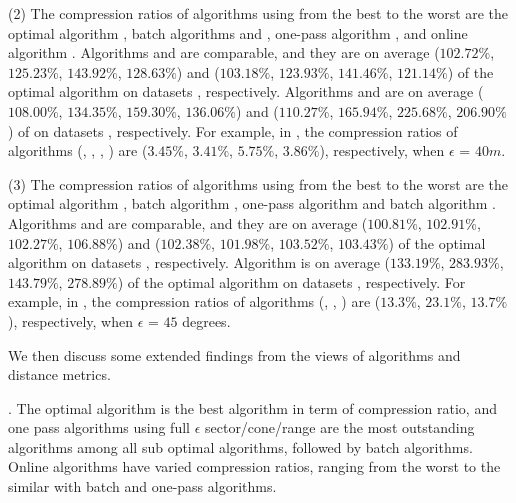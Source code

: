 \sstab(2) The compression ratios of algorithms using \sed from the best
to the worst are the optimal algorithm \opt, batch algorithms \tpa and
\dpa, one-pass algorithm \cised, and online algorithm \squishe.
%
{Algorithms \tpa and \dpa are comparable, and they are on average
($102.72\%$, $125.23\%$, $143.92\%$, $128.63\%$) and ($103.18\%$, $123.93\%$, $141.46\%$, $121.14\%$)
 of the optimal algorithm \opt on datasets \dSets, respectively.}
%
{Algorithms \cised and \squishe are on average ($108.00\%$,
  $134.35\%$, $159.30\%$, $136.06\%$) and ($110.27\%$, $165.94\%$, $225.68\%$, $206.90\%$)
 of \opt on datasets \dSets, respectively.}
%
For example, in \mopsi, the compression ratios of algorithms
(\tpa, \dpa, \squishe, \cised)
are ($3.45\%$, $3.41\%$, $5.75\%$, $3.86\%$), respectively, when $\epsilon$ = $40m$.
%
%
%

\sstab(3) The compression ratios of algorithms using \dad from the best
to the worst are the optimal algorithm \opt, batch algorithm \tpa,
one-pass algorithm \interval and batch algorithm \dpa.
%
{Algorithms \tpa and \interval are comparable, and they are on average
($100.81\%$, $102.91\%$, $102.27\%$, $106.88\%$) and ($102.38\%$, $101.98\%$, $103.52\%$, $103.43\%$)
 of the optimal algorithm \opt on datasets \dSets, respectively.}
%
{Algorithm \dpa is on average ($133.19\%$, $283.93\%$, $143.79\%$, $278.89\%$)
 of the optimal algorithm \opt on datasets \dSets, respectively.}
%
For example, in \mopsi, the compression ratios of algorithms (\tpa, \dpa, \interval)
are ($13.3\%$, $23.1\%$, $13.7\%$), respectively, when $\epsilon$ = $45$ degrees.
%


We then discuss some extended findings from the views of \lsa algorithms and distance metrics.

. The optimal algorithm is the best algorithm in term of compression ratio, and one pass algorithms using full $\epsilon$ sector/cone/range are the most outstanding algorithms among all sub optimal algorithms, followed by batch algorithms. Online algorithms have varied compression ratios, ranging from the worst to the similar with batch and one-pass algorithms.

